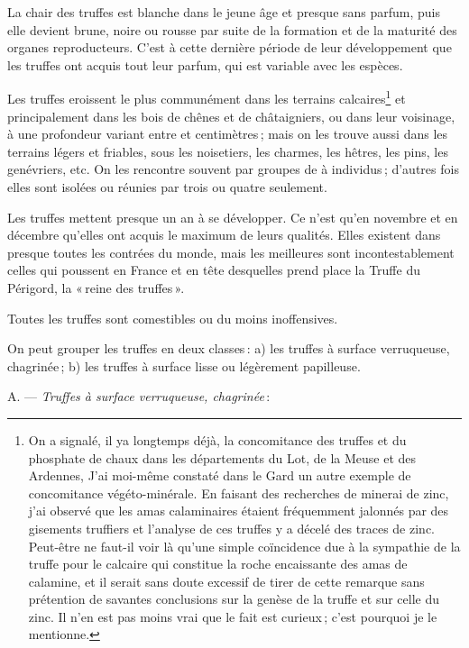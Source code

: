 La chair des truffes est blanche dans le jeune âge et presque sans parfum, puis
elle devient brune, noire ou rousse par suite de la formation et de la maturité des
organes reproducteurs. C'est à cette dernière période de leur développement que
les truffes ont acquis tout leur parfum, qui est variable avec les espèces.

Les truffes eroissent le plus communément dans les terrains
calcaires\footnote{On a signalé, il ya longtemps déjà, la concomitance des
truffes et du phosphate de chaux dans les départements du Lot, de la Meuse et
des Ardennes, J'ai moi-même constaté dans le Gard un autre exemple de
concomitance végéto-minérale. En faisant des recherches de minerai de zinc,
j'ai observé que les amas calaminaires étaient fréquemment jalonnés par des
gisements truffiers et l'analyse de ces truffes y a décelé des traces de zinc.
Peut-être ne faut-il voir là qu'une simple coïncidence due à la sympathie de la
truffe pour le calcaire qui constitue la roche encaissante des amas de
calamine, et il serait sans doute excessif de tirer de cette remarque sans
prétention de savantes conclusions sur la genèse de la truffe et sur celle du
zinc. Il n'en est pas moins vrai que le fait est curieux ; c'est pourquoi je le
mentionne.} et principalement dans les bois de chênes et de châtaigniers, ou
dans leur voisinage, à une profondeur variant entre {\mmm} et
{\mmm} centimètres ; mais on les trouve aussi dans les terrains légers et
friables, sous les noisetiers, les charmes, les hêtres, les pins, les
genévriers, etc. On les rencontre souvent par groupes de {\mmm}
à {\mmm} individus ; d'autres fois elles sont isolées ou réunies par
trois ou quatre seulement.

Les truffes mettent presque un an à se développer. Ce n'est qu'en novembre et
en décembre qu'elles ont acquis le maximum de leurs qualités. Elles existent
dans presque toutes les contrées du monde, mais les meilleures sont
incontestablement celles qui poussent en France et en tête desquelles prend
place la Truffe du Périgord, la « reine des truffes ».

Toutes les truffes sont comestibles ou du moins inoffensives.

On peut grouper les truffes en deux classes : a) les truffes à surface
verruqueuse, chagrinée ; b) les truffes à surface lisse ou légèrement
papilleuse.

\begin{center}
A. — \textit{Truffes à surface verruqueuse, chagrinée} :
\end{center}

